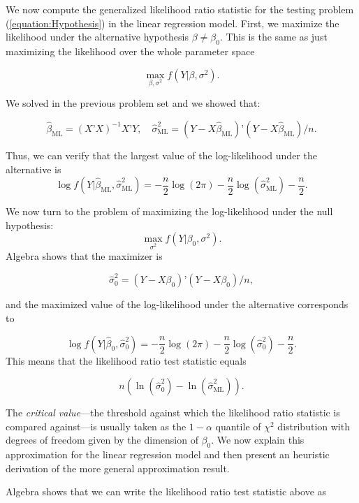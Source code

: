 \documentclass[11pt]{article} %
\begin{document}
 We now compute the generalized likelihood ratio statistic for the testing problem (\ref{equation:Hypothesis}) in the linear regression model. First, we maximize the likelihood under the alternative hypothesis $\beta \neq \beta_0$. This is the same as just maximizing the likelihood over the whole parameter space

\[  \max_{\beta, \sigma^2} f(Y | \beta , \sigma^2). \] 

\noindent We solved in the previous problem set and we showed that:

\[ \widehat{\beta}_{\textrm{ML}} = (X’X)^{-1}X’Y, \quad \widehat{\sigma}^2_{\textrm{ML}} = (Y-X\widehat{\beta}_{\textrm{ML}})’(Y-X\widehat{\beta}_{\textrm{ML}})/n. \] 

\noindent Thus, we can verify that the largest value of the log-likelihood under the alternative is
\[ \log f(Y | \widehat{\beta}_{\textrm{ML}}, \widehat{\sigma}^2_{\textrm{ML}}) = - \frac{n}{2} \log(2 \pi ) - \frac{n}{2} \log( \widehat{\sigma}^2_{\textrm{ML}}) - \frac{n}{2}. \]

\noindent We now turn to the problem of maximizing the log-likelihood under the null hypothesis:
\[ \max_{\sigma^2} f(Y | \beta_0 , \sigma^2). \]
Algebra shows that the maximizer is

\[\widehat{\sigma}^2_{0} = (Y-X\beta_0)’(Y-X \beta_0)/n,\]

\noindent and the maximized value of the log-likelihood under the alternative corresponds to

\[ \log f(Y | \widehat{\beta}_{0}, \widehat{\sigma}^2_{0}) = - \frac{n}{2} \log(2 \pi ) - \frac{n}{2} \log( \widehat{\sigma}^2_{0}) - \frac{n}{2}. \]
\noindent This means that the likelihood ratio test statistic equals

\begin{equation} \label{equation:GLR}
n  \left( \ln ( \widehat{\sigma}^2_{0} ) -\ln( \widehat{\sigma}^2_{\textrm{ML}} ) \right). 
\end{equation}

The \emph{critical value}---the threshold against which the likelihood ratio statistic is compared against---is usually taken as the $1-\alpha$ quantile of $\chi^2$ distribution with degrees of freedom given by the dimension of $\beta_0$. We now explain this approximation for the linear regression model and then present an heuristic derivation of the more general approximation result. 

Algebra shows that we can write the likelihood ratio test statistic above as
\end{document}
